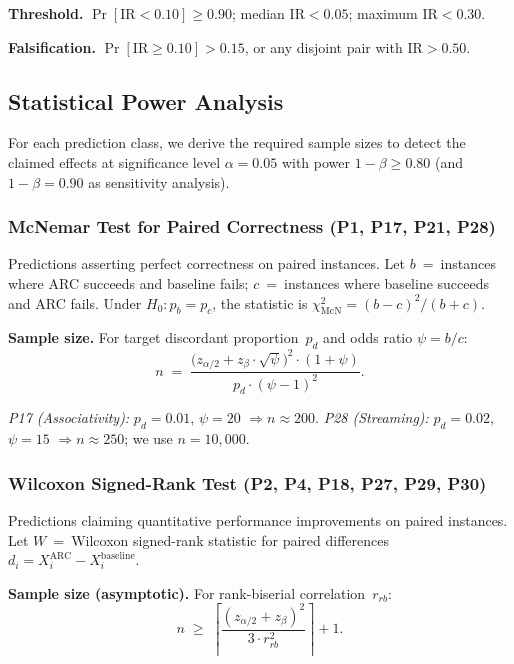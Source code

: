 \documentclass[11pt,a4paper]{article}
\theoremstyle{definition}
\begin{document}
\textbf{Threshold.}  $\Pr[\mathrm{IR} < 0.10] \geq 0.90$; median
$\mathrm{IR} < 0.05$; maximum $\mathrm{IR} < 0.30$.

\textbf{Falsification.}  $\Pr[\mathrm{IR} \geq 0.10] > 0.15$, or any
disjoint pair with $\mathrm{IR} > 0.50$.


\subsection{Statistical Power Analysis}
\label{sec:power-analysis}

For each prediction class, we derive the required sample sizes to detect
the claimed effects at significance level $\alpha = 0.05$ with power
$1 - \beta \geq 0.80$ (and $1 - \beta = 0.90$ as sensitivity analysis).

\subsubsection{McNemar Test for Paired Correctness (P1, P17, P21, P28)}

Predictions asserting perfect correctness on paired instances.
Let $b$~=~instances where ARC succeeds and baseline fails;
$c$~=~instances where baseline succeeds and ARC fails.
Under $H_0\!: p_b = p_c$, the statistic is
$\chi^2_{\mathrm{McN}} = (b - c)^2 / (b + c)$.

\textbf{Sample size.}  For target discordant proportion~$p_d$ and odds
ratio $\psi = b/c$:
\[
  n \;=\; \frac{\bigl(z_{\alpha/2} + z_\beta \cdot
    \sqrt{\psi}\bigr)^2 \cdot (1 + \psi)}{p_d \cdot (\psi - 1)^2}.
\]

\emph{P17 (Associativity):} $p_d = 0.01$, $\psi = 20$
$\Rightarrow n \approx 200$.
\emph{P28 (Streaming):} $p_d = 0.02$, $\psi = 15$
$\Rightarrow n \approx 250$; we use $n = 10{,}000$.

\subsubsection{Wilcoxon Signed-Rank Test (P2, P4, P18, P27, P29, P30)}

Predictions claiming quantitative performance improvements on paired instances.
Let $W$~=~Wilcoxon signed-rank statistic for paired differences
$d_i = X_i^{\mathrm{ARC}} - X_i^{\mathrm{baseline}}$.

\textbf{Sample size (asymptotic).}
For rank-biserial correlation~$r_{rb}$:
\[
  n \;\geq\;
  \left\lceil \frac{(z_{\alpha/2} + z_\beta)^2}{3 \cdot r_{rb}^2}
  \right\rceil + 1.
\]
\end{document}
